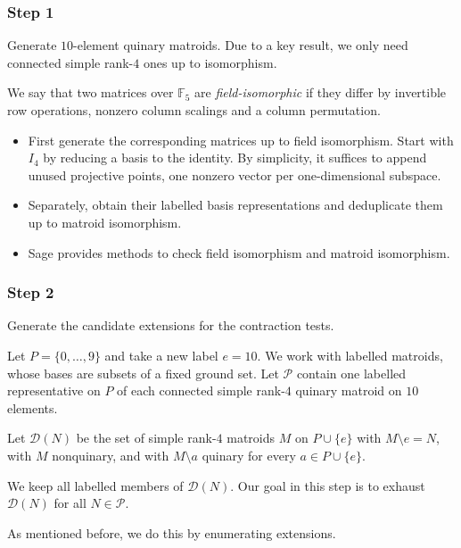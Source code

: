 \documentclass{beamer}
\newcommand{\F}{\mathbb{F}}
\begin{document}
\begin{frame}
  \frametitle{Step 1}
  Generate $10$-element quinary matroids. Due to a key result, we only
  need connected simple rank-$4$ ones up to isomorphism.

  We say that two matrices over $\F_5$ are \emph{field-isomorphic} if they
  differ by invertible row operations, nonzero column scalings and a
  column permutation.
  \begin{itemize}
    \item First generate the corresponding matrices up to field isomorphism.
      Start with $I_4$ by reducing a basis to the identity. By simplicity,
      it suffices to append unused projective points, one nonzero vector
      per one-dimensional subspace.
    \item Separately, obtain their labelled basis representations and
      deduplicate them up to matroid isomorphism.
    \item Sage provides methods to check field isomorphism and matroid
      isomorphism.
  \end{itemize}
\end{frame}
\begin{frame}
  \frametitle{Step 2}
  Generate the candidate extensions for the contraction tests.

  \par Let $P=\{0,\dots,9\}$ and take a new label $e=10$. We work with
  labelled matroids, whose bases are subsets of a fixed ground set.
  Let $\mathcal P$ contain one labelled representative on $P$ of each
  connected simple rank-$4$ quinary matroid on $10$ elements.

  \par Let $\mathcal D(N)$ be the set of simple rank-$4$ matroids $M$ on
  $P\cup\{e\}$ with $M\setminus e=N$, with $M$ nonquinary, and with
  $M\setminus a$ quinary for every $a\in P\cup\{e\}$.

  \par We keep all labelled members of $\mathcal D(N)$.
  Our goal in this step is to exhaust $\mathcal D(N)$ for all
  $N\in\mathcal P$.
  \par As mentioned before, we do this by enumerating extensions.
\end{frame}
\end{document}
